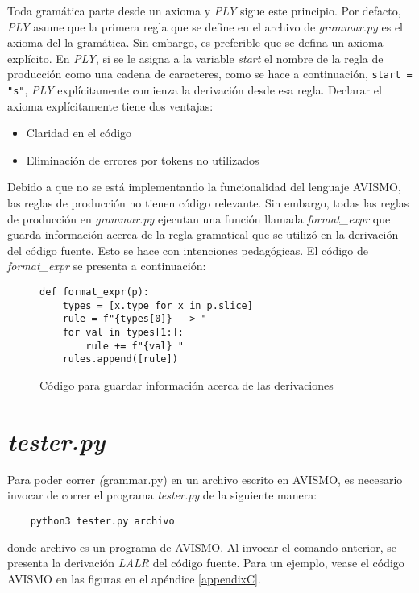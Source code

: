 Toda gramática parte desde un axioma y \textit{PLY} sigue este principio.
Por defacto, \textit{PLY} asume que la primera regla que se define en el archivo de \textit{grammar.py} es el axioma del la gramática.
Sin embargo, es preferible que se defina un axioma explícito.
En \textit{PLY}, si se le asigna a la variable \textit{start} el nombre de la regla de producción como una cadena de caracteres, como se hace a continuación, \texttt{start = "s"}, \textit{PLY} explícitamente comienza la derivación desde esa regla. Declarar el axioma explícitamente tiene dos ventajas:
\begin{itemize}
	\item Claridad en el código
	\item Eliminación de errores por tokens no utilizados
\end{itemize}

Debido a que no se está implementando la funcionalidad del lenguaje AVISMO, las reglas de producción no tienen código relevante. Sin embargo, todas las reglas de producción en \textit{grammar.py} ejecutan una función llamada \textit{format\_expr} que guarda información acerca de la regla gramatical que se utilizó en la derivación del código fuente.
Esto se hace con intenciones pedagógicas.
El código de \textit{format\_expr} se presenta a continuación:
\begin{figure}[H]
	\begin{verbatim}
def format_expr(p):
    types = [x.type for x in p.slice]
    rule = f"{types[0]} --> "
    for val in types[1:]:
        rule += f"{val} "
    rules.append([rule])
\end{verbatim}
	\caption{Código para guardar información acerca de las derivaciones}
	\label{fig: formatExpr}
\end{figure}

\section{\textit{tester.py}}

Para poder correr \textit(grammar.py) en un archivo escrito en AVISMO, es necesario invocar de correr el programa \textit{tester.py} de la siguiente manera:
\begin{verbatim}
	python3 tester.py archivo
\end{verbatim}
donde archivo es un programa de AVISMO. Al invocar el comando anterior, se presenta la derivación \textit{LALR} del código fuente. Para un ejemplo, vease el código AVISMO en las figuras en el apéndice \ref{appendixC}.


